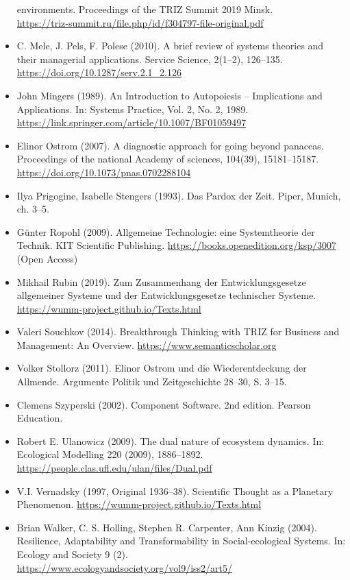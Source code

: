 \documentclass[11pt,a4paper]{article}
\begin{document}
\begin{itemize}
  environments. Proceedings of the TRIZ Summit 2019 Minsk.\\
  \url{https://triz-summit.ru/file.php/id/f304797-file-original.pdf}
\item C. Mele, J. Pels, F. Polese (2010). A brief review of systems theories
  and their managerial applications. Service Science, 2(1--2), 126--135.\\
  \url{https://doi.org/10.1287/serv.2.1_2.126}
\item John Mingers (1989). An Introduction to Autopoiesis -- Implications and
  Applications. In: Systems Practice, Vol. 2, No. 2, 1989.\\
  \url{https://link.springer.com/article/10.1007/BF01059497} 
\item Elinor Ostrom (2007). A diagnostic approach for going beyond panaceas.
  Proceedings of the national Academy of sciences, 104(39), 15181--15187.\\
  \url{https://doi.org/10.1073/pnas.0702288104}
\item Ilya Prigogine, Isabelle Stengers (1993). Das Pardox der Zeit. Piper,
  Munich, ch. 3--5.  
\item Günter Ropohl (2009). Allgemeine Technologie: eine Systemtheorie der
  Technik.  KIT Scientific Publishing.
  \url{https://books.openedition.org/ksp/3007} (Open Access) 
\item Mikhail Rubin (2019).  Zum Zusammenhang der Entwicklungsgesetze
  allgemeiner Systeme und der Entwicklungsgesetze technischer Systeme. \\
  \url{https://wumm-project.github.io/Texts.html}
\item Valeri Souchkov (2014). Breakthrough Thinking with TRIZ for Business
  and Management: An Overview. \url{https://www.semanticscholar.org}
\item Volker Stollorz (2011). Elinor Ostrom und die Wiederentdeckung der
  Allmende. Argumente Politik und Zeitgeschichte 28--30, S. 3--15. 
\item Clemens Szyperski (2002). Component Software. 2nd edition. Pearson
  Education. 
\item Robert E. Ulanowicz (2009). The dual nature of ecosystem dynamics.
  In: Ecological Modelling 220 (2009), 1886–1892.\\
  \url{https://people.clas.ufl.edu/ulan/files/Dual.pdf} 
\item V.I. Vernadsky (1997, Original 1936--38). Scientific Thought as a
  Planetary Phenomenon. \url{https://wumm-project.github.io/Texts.html}
\item Brian Walker, C. S. Holling, Stephen R. Carpenter, Ann Kinzig (2004).
  Resilience, Adaptability and Transformability in Social-ecological Systems. 
  In: Ecology and Society 9 (2).
  \url{https://www.ecologyandsociety.org/vol9/iss2/art5/}
\end{itemize}
\end{document}
